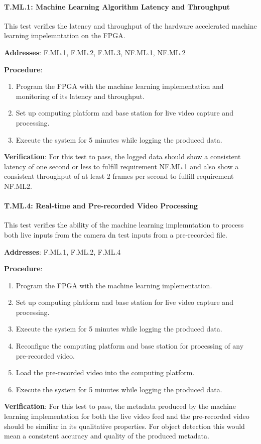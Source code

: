 \paragraph{T.ML.1: Machine Learning Algorithm Latency and Throughput}

This test verifies the latency and throughput of the hardware accelerated machine learning impelemntation on the FPGA.

\textbf{Addresses}:  F.ML.1, F.ML.2, F.ML.3, NF.ML.1, NF.ML.2

\textbf{Procedure}:
\begin{enumerate}[noitemsep]
    \item Program the FPGA with the machine learning implementation and monitoring of its latency and throughput.
    \item Set up computing platform and base station for live video capture and processing.
    \item Execute the system for 5 minutes while logging the produced data.
\end{enumerate}

\textbf{Verification}: 
For this test to pass, the logged data should show a consistent latency of one second or less to fulfill requirement NF.ML.1 and also show a consistent throughput of at least 2 frames per second to fulfill requirement NF.ML2.

%

\paragraph{T.ML.4: Real-time and Pre-recorded Video Processing}

This test verifies the ability of the machine learning implemntation to process both live inputs from the camera dn test inputs from a pre-recorded file.

\textbf{Addresses}:  F.ML.1, F.ML.2, F.ML.4

\textbf{Procedure}:
\begin{enumerate}[noitemsep]
    \item Program the FPGA with the machine learning implementation.
    \item Set up computing platform and base station for live video capture and processing.
    \item Execute the system for 5 minutes while logging the produced data.
    \item Reconfigue the computing platform and base station for processing of any pre-recorded video.
    \item Load the pre-recorded video into the computing platform.
    \item Execute the system for 5 minutes while logging the produced data.
\end{enumerate}

\textbf{Verification}: 
For this test to pass, the metadata produced by the machine learning implementation for both the live video feed and the pre-recorded video should be similiar in its qualitative properties. For object detection this would mean a consistent accuracy and quality of the produced metadata.

%